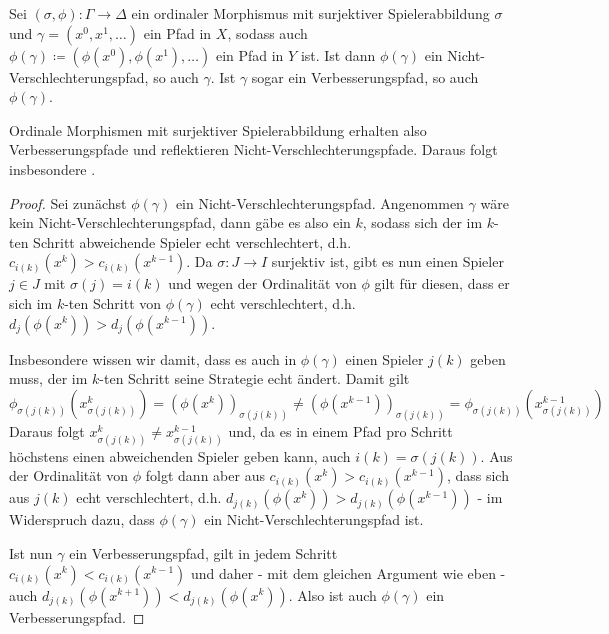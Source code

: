 \begin{prop}\label{prop:NVReflVerbErh}
	Sei $(\sigma, \phi): \Gamma \to \Delta$ ein ordinaler Morphismus mit surjektiver Spielerabbildung $\sigma$ und $\gamma = (x^0, x^1, \dots)$ ein Pfad in $X$, sodass auch $\phi(\gamma) \coloneqq (\phi(x^0), \phi(x^1), \dots)$ ein Pfad in $Y$ ist. Ist dann $\phi(\gamma)$ ein Nicht-Verschlechterungspfad, so auch $\gamma$. Ist $\gamma$ sogar ein Verbesserungspfad, so auch $\phi(\gamma)$.
\end{prop}

Ordinale Morphismen mit surjektiver Spielerabbildung erhalten also Verbesserungspfade und reflektieren Nicht-Verschlechterungspfade. Daraus folgt insbesondere .

\begin{proof}
	Sei zunächst $\phi(\gamma)$ ein Nicht-Verschlechterungspfad. Angenommen $\gamma$ wäre kein Nicht-Verschlechterungspfad, dann gäbe es also ein $k$, sodass sich der im $k$-ten Schritt abweichende Spieler echt verschlechtert, d.h. $c_{i(k)}(x^k) > c_{i(k)}(x^{k-1})$. Da $\sigma: J \to I$ surjektiv ist, gibt es nun einen Spieler $j \in J$ mit $\sigma(j) = i(k)$ und wegen der Ordinalität von $\phi$ gilt für diesen, dass er sich im $k$-ten Schritt von $\phi(\gamma)$ echt verschlechtert, d.h. $d_j(\phi(x^k)) > d_j(\phi(x^{k-1}))$. 
	
	Insbesondere wissen wir damit, dass es auch in $\phi(\gamma)$ einen Spieler $j(k)$ geben muss, der im $k$-ten Schritt seine Strategie echt ändert. Damit gilt
		\[\phi_{\sigma(j(k))}\left(x_{\sigma(j(k))}^k\right) = \left(\phi(x^k)\right)_{\sigma(j(k))} \neq \left(\phi(x^{k-1})\right)_{\sigma(j(k))} = \phi_{\sigma(j(k))}\left(x_{\sigma(j(k))}^{k-1}\right)\]
	Daraus folgt $x_{\sigma(j(k))}^k \neq x_{\sigma(j(k))}^{k-1}$ und, da es in einem Pfad pro Schritt höchstens einen abweichenden Spieler geben kann, auch $i(k) = \sigma(j(k))$. Aus der Ordinalität von $\phi$ folgt dann aber aus $c_{i(k)}(x^k) > c_{i(k)}(x^{k-1})$, dass sich aus $j(k)$ echt verschlechtert, d.h. $d_{j(k)}(\phi(x^k)) > d_{j(k)}(\phi(x^{k-1}))$ - im Widerspruch dazu, dass $\phi(\gamma)$ ein Nicht-Verschlechterungspfad ist.

	Ist nun $\gamma$ ein Verbesserungspfad, gilt in jedem Schritt $c_{i(k)}(x^{k}) < c_{i(k)}(x^{k-1})$ und daher - mit dem gleichen Argument wie eben - auch $d_{j(k)}(\phi(x^{k+1})) < d_{j(k)}(\phi(x^k))$. Also ist auch $\phi(\gamma)$ ein Verbesserungspfad.
\end{proof}

